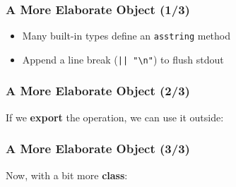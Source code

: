\begin{frame}[fragile]

\frametitle{A More Elaborate Object (1/3)}



\begin{itemize}

\item Many built-in types define an \texttt{asstring} method

\item Append a line break (\lstinline{|| "\n"}) to flush stdout

\end{itemize}

\end{frame}

\begin{frame}[fragile]

\frametitle{A More Elaborate Object (2/3)}

If we \textbf{export} the operation, we can use it outside:



\end{frame}


\begin{frame}[fragile]

\frametitle{A More Elaborate Object (3/3)}

Now, with a bit more \textbf{class}:



\end{frame}

